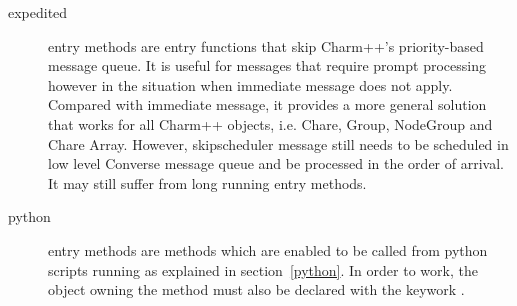 \begin{description}
\item[expedited] entry methods are entry functions 
that skip Charm++'s priority-based message queue. It is useful for messages that
require prompt processing however in the situation when immediate message does
not apply. Compared with immediate message, it provides a more general solution
that works for all Charm++ objects, i.e. Chare, Group, NodeGroup and Chare
Array. However, skipscheduler message still needs to be scheduled in low level
Converse message queue and be processed in the order of arrival. It may still
suffer from long running entry methods.


\item[python] entry methods are methods which are enabled to be
called from python scripts running as explained in section~\ref{python}. In
order to work, the object owning the method must also be declared with the
keywork .

\end{description}
